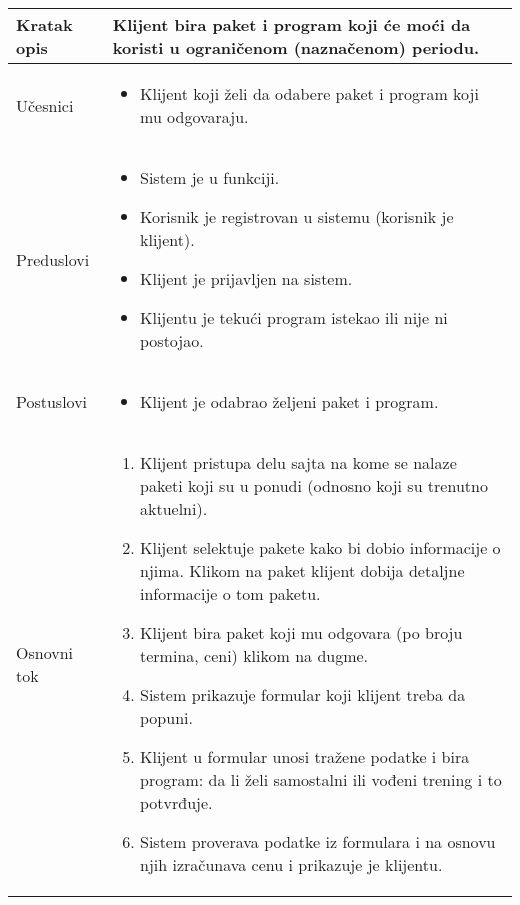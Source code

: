 \documentclass[../main.tex]{subfiles}
\begin{document}
\begin{longtable}{| p{} | p{} |} 

\hline
    Kratak opis & Klijent bira paket i program koji će moći da koristi u ograničenom (naznačenom) periodu. \\ 
\hline    
    Učesnici & 
    	\begin{itemize}
        \item Klijent koji želi da odabere paket i program koji mu odgovaraju.
     \end{itemize}\\
\hline
   Preduslovi & \begin{itemize}
       \item Sistem je u funkciji.
       \item Korisnik je registrovan u sistemu (korisnik je klijent).
       \item Klijent je prijavljen na sistem.
       \item Klijentu je tekući program istekao ili nije ni postojao.
   \end{itemize}\\
\hline  
    Postuslovi & \begin{itemize}
        \item Klijent je odabrao željeni paket i program.
    \end{itemize}\\
\hline
    Osnovni tok & \begin{enumerate}
        \item Klijent pristupa delu sajta na kome se nalaze paketi koji su u ponudi (odnosno koji su trenutno aktuelni).
        \item Klijent selektuje pakete kako bi dobio informacije o njima. Klikom na paket klijent dobija detaljne informacije o tom paketu.
        \item Klijent bira paket koji mu odgovara (po broju termina, ceni) klikom na dugme.
        \item Sistem prikazuje formular koji klijent treba da popuni.
        \item Klijent u formular unosi tražene podatke i bira program: da li želi samostalni ili vođeni trening i to potvrđuje.
        \item Sistem proverava podatke iz formulara i na osnovu njih izračunava cenu i prikazuje je klijentu.

\end{enumerate}
\end{longtable}
\end{document}
